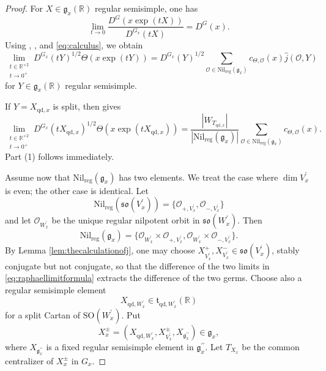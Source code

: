 \documentclass[12pt]{amsart}
\numberwithin{equation}{subsection}
\newcommand{\BR}{{\mathbb {R}}}
\newcommand{\CO}{{\mathcal {O}}}
\newcommand{\Fg}{{\mathfrak {g}}}
\newcommand{\Fo}{{\mathfrak {o}}}
\newcommand{\Fs}{{\mathfrak {s}}}
\newcommand{\Ft}{{\mathfrak {t}}}
\newcommand{\reg}{{\mathrm{reg}}}
\newcommand{\SO}{{\mathrm{SO}}}
\def\nil{\mathrm{Nil}}
\def\p{\prime}
\def\qd{\mathrm{qd}}
\def\SO{\mathrm{SO}}
\begin{document}
\begin{proof}
For $X\in \Fg_x(\BR)$ regular semisimple, one has
\begin{equation}\label{eq:calculus}
\lim_{t\to 0}
\frac{D^G(x\exp(tX))}{D^{G_x}(tX)}
=
D^G(x).
\end{equation}
Using \cite[Prop.~4.4.1~(vi)]{beuzart2015local},
\cite[(1.8.5)]{beuzart2015local}, and \eqref{eq:calculus}, we obtain
\begin{equation}\label{eq:raphaellimitformula}
\lim_{\substack{t\in \BR^{\times 2}\\ t\to 0^+}}
D^{G_x}(tY)^{1/2}\Theta(x\exp(tY))
=
D^{G_x}(Y)^{1/2}
\sum_{\CO\in \nil_\reg(\Fg_x)}
c_{\Theta,\CO}(x)\widehat{j}(\CO,Y)
\end{equation}
for $Y\in \Fg_x(\BR)$ regular semisimple.

If $Y=X_{\qd,x}$ is split, then \cite[(3.4.7)]{beuzart2015local} gives
\begin{equation}\label{eq:limitgermforaddition:1}
\lim_{\substack{t\in \BR^{\times 2}\\ t\to 0^+}}
D^{G_x}(tX_{\qd,x})^{1/2}\Theta(x\exp(tX_{\qd,x}))
=
\frac{|W_{T_{\qd,x}}|}{|\nil_\reg(\Fg_x)|}
\sum_{\CO\in \nil_\reg(\Fg_x)}
c_{\Theta,\CO}(x).
\end{equation}
Part (1) follows immediately.

Assume now that $\nil_\reg(\Fg_x)$ has two elements. We treat the case where
$\dim V^\p_x$ is even; the other case is identical. Let
\[
\nil_\reg(\Fs\Fo(V^\p_x))
=
\{\CO_{+,V^\p_x},\CO_{-,V^\p_x}\}
\]
and let $\CO_{W^\p_x}$ be the unique regular nilpotent orbit in
$\Fs\Fo(W^\p_x)$. Then
\[
\nil_\reg(\Fg_x)
=
\{
\CO_{W^\p_x}\times \CO_{+,V^\p_x},
\CO_{W^\p_x}\times \CO_{-,V^\p_x}
\}.
\]
By Lemma \ref{lem:thecalculationofj}, one may choose
$X^+_{V^\p_x},X^-_{V^\p_x}\in \Fs\Fo(V^\p_x)$, stably conjugate but not
conjugate, so that the difference of the two limits in
\eqref{eq:raphaellimitformula} extracts the difference of the two germs.
Choose also a regular semisimple element
\[
X_{\qd,W^\p_x}\in \Ft_{\qd,W^\p_x}(\BR)
\]
for a split Cartan of $\SO(W^\p_x)$. Put
\[
X_x^\pm
=
(X_{\qd,W^\p_x},X^\pm_{V^\p_x},X_{\Fg_x^{\p\p}})
\in \Fg_x,
\]
where $X_{\Fg_x^{\p\p}}$ is a fixed regular semisimple element in
$\Fg_x^{\p\p}$. Let $T_{X_x}$ be the common centralizer of $X_x^\pm$ in $G_x$.


\end{proof}
\end{document}
